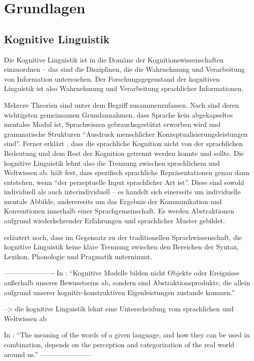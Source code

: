 \section{Grundlagen}

\subsection{Kognitive Linguistik}

Die Kognitive Linguistik ist in die Domäne der Kognitionswissenschaften einzuordnen -- das sind die Disziplinen, die die Wahrnehmung und Verarbeitung von Information untersuchen.
Der Forschungsgegenstand der kognitiven Linguistik ist also Wahrnehmung und Verarbeitung sprachlicher Informationen.

Mehrere Theorien sind unter dem Begriff zusammenzufassen.
Nach \cite{Ziem13} sind deren wichtigsten gemeinsamen Grundannahmen, dass Sprache kein abgekapseltes mentales Modul ist, Sprachwissen gebrauchsgestützt erworben wird und grammatische Strukturen ``Ausdruck menschlicher Konzeptualisierungsleistungen sind''.
Ferner erklärt \cite{Ellis08}, dass die sprachliche Kognition nicht von der sprachlichen Bedeutung und dem Rest der Kognition getrennt werden konnte und sollte.
Die kognitive Linguistik lehnt also die Trennung zwischen sprachlichem und Weltwissen ab.
\cite{Ziem08} hält fest, dass spezifisch sprachliche Repräsentationen genau dann entstehen, wenn ``der perzeptuelle Input sprachlicher Art ist''.
Diese sind sowohl individuell als auch interindividuell -- es handelt sich einerseits um individuelle mentale Abbilde, andererseits um das Ergebnis der Kommunikation und Konventionen innerhalb einer Sprachgemeinschaft.
Es werden Abstraktionen aufgrund wiederkehrender Erfahrungen und sprachlicher Muster gebildet.

\cite{Ellis08} erläutert noch, dass im Gegensatz zu der traditionellen Sprachwissenschaft, die kognitive Linguistik keine klare Trennung zwischen den Bereichen der Syntax, Lexikon, Phonologie und Pragmatik unternimmt.

----------------------
In \cite{Ziem08}: ``Kognitive Modelle bilden nicht Objekte oder Ereignisse außerhalb unseres
Bewusstseins ab, sondern sind Abstraktionsprodukte, die allein aufgrund
unserer kognitiv-konstruktiven Eigenleistungen zustande kommen.''

--> die kognitive Linguistik lehnt eine Unterscheidung vom sprachlichen und Weltwissen ab


In \cite{Ellis08}: ``The meaning of the words of a given language, and how they can be used in combination, depends on the perception and categorization of the real world around us.''
-----------------------

